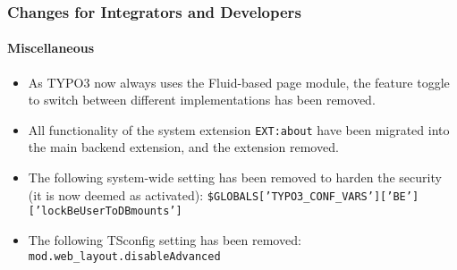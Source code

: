 %

\begin{frame}[fragile]
	\frametitle{Changes for Integrators and Developers}
	\framesubtitle{Miscellaneous}

	\begin{itemize}
		\item As TYPO3 now always uses the Fluid-based page module, the feature
			toggle to switch between different implementations has been removed.
		\item All functionality of the system extension \texttt{EXT:about}
			have been migrated into the main backend extension, and the
			extension removed.
		\item The following system-wide setting has been removed to harden the security
			(it is now deemed as activated):\newline
			\smaller\texttt{\$GLOBALS['TYPO3\_CONF\_VARS']['BE']['lockBeUserToDBmounts']}\normalsize
		\item The following TSconfig setting has been removed:\newline
			\smaller\texttt{mod.web\_layout.disableAdvanced}\normalsize
	\end{itemize}

\end{frame}

